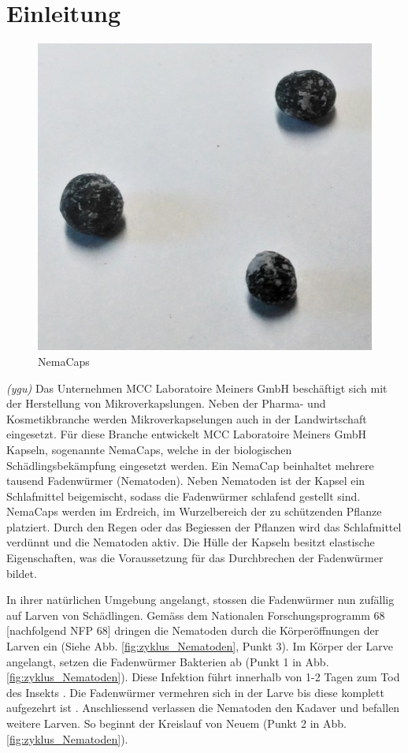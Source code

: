 \newpage
\section{Einleitung}
\begin{figure}
	\includegraphics[scale=0.18]{Illustrationen/3-Einleitung/nemacaps.jpg}
	\caption{NemaCaps}
	\label{fig:nemacaps}
\end{figure}
\textit{(ygu)} Das Unternehmen MCC Laboratoire Meiners GmbH beschäftigt sich mit der Herstellung von Mikroverkapslungen. Neben der Pharma- und Kosmetikbranche werden Mikroverkapselungen auch in der Landwirtschaft eingesetzt. Für diese Branche entwickelt MCC Laboratoire Meiners GmbH Kapseln, sogenannte NemaCaps, welche in der biologischen Schädlingsbekämpfung eingesetzt werden. Ein NemaCap beinhaltet mehrere tausend Fadenwürmer (Nematoden). Neben Nematoden ist der Kapsel ein Schlafmittel beigemischt, sodass die Fadenwürmer schlafend gestellt sind. 
\newline
NemaCaps werden im Erdreich, im Wurzelbereich der zu schützenden Pflanze platziert. Durch den Regen oder das Begiessen der Pflanzen wird das Schlafmittel verdünnt und die Nematoden aktiv. Die Hülle der Kapseln besitzt elastische Eigenschaften, was die Voraussetzung für das Durchbrechen der Fadenwürmer bildet. 
\newline

In ihrer natürlichen Umgebung angelangt, stossen die Fadenwürmer nun zufällig auf Larven von Schädlingen. Gemäss dem Nationalen Forschungsprogramm 68 [nachfolgend NFP 68]\cite{nfp} dringen die Nematoden durch die Körperöffnungen der Larven ein (Siehe Abb.  \ref{fig:zyklus_Nematoden}, Punkt 3). Im Körper der Larve angelangt, setzen die Fadenwürmer Bakterien ab (Punkt 1 in Abb.  \ref{fig:zyklus_Nematoden}). Diese Infektion führt innerhalb von 1-2 Tagen zum Tod des Insekts \cite{e-nema}. Die Fadenwürmer vermehren sich in der Larve bis diese komplett aufgezehrt ist \cite{nematoden}. Anschliessend verlassen die Nematoden den Kadaver und befallen weitere Larven. So beginnt der Kreislauf von Neuem (Punkt 2 in Abb.  \ref{fig:zyklus_Nematoden}).
\newline

